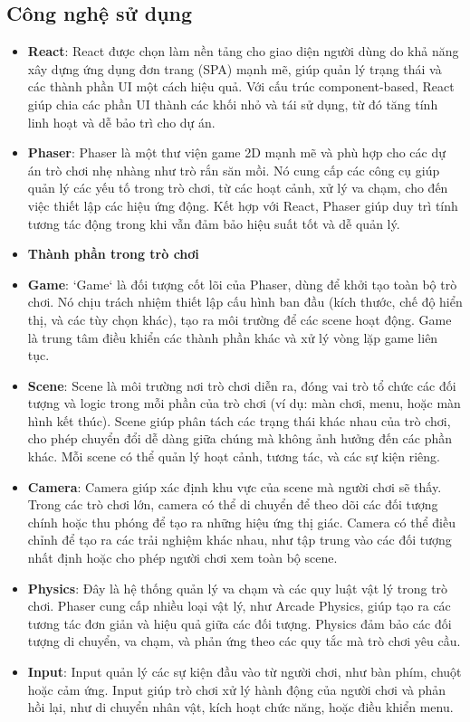 \documentclass[a4paper, 12pt]{article}
\begin{document}
\subsection{Công nghệ sử dụng}
\begin{itemize}
    \item \textbf{React}: React được chọn làm nền tảng cho giao diện người dùng do khả năng xây dựng ứng dụng đơn trang (SPA) mạnh mẽ, giúp quản lý trạng thái và các thành phần UI một cách hiệu quả. Với cấu trúc component-based, React giúp chia các phần UI thành các khối nhỏ và tái sử dụng, từ đó tăng tính linh hoạt và dễ bảo trì cho dự án.

    \item \textbf{Phaser}: Phaser là một thư viện game 2D mạnh mẽ và phù hợp cho các dự án trò chơi nhẹ nhàng như trò rắn săn mồi. Nó cung cấp các công cụ giúp quản lý các yếu tố trong trò chơi, từ các hoạt cảnh, xử lý va chạm, cho đến việc thiết lập các hiệu ứng động. Kết hợp với React, Phaser giúp duy trì tính tương tác động trong khi vẫn đảm bảo hiệu suất tốt và dễ quản lý.

    \item \textbf{Thành phần trong trò chơi}

     \item \textbf{Game}: `Game` là đối tượng cốt lõi của Phaser, dùng để khởi tạo toàn bộ trò chơi. Nó chịu trách nhiệm thiết lập cấu hình ban đầu (kích thước, chế độ hiển thị, và các tùy chọn khác), tạo ra môi trường để các scene hoạt động. Game là trung tâm điều khiển các thành phần khác và xử lý vòng lặp game liên tục.

    \item \textbf{Scene}: Scene là môi trường nơi trò chơi diễn ra, đóng vai trò tổ chức các đối tượng và logic trong mỗi phần của trò chơi (ví dụ: màn chơi, menu, hoặc màn hình kết thúc). Scene giúp phân tách các trạng thái khác nhau của trò chơi, cho phép chuyển đổi dễ dàng giữa chúng mà không ảnh hưởng đến các phần khác. Mỗi scene có thể quản lý hoạt cảnh, tương tác, và các sự kiện riêng.

    \item \textbf{Camera}: Camera giúp xác định khu vực của scene mà người chơi sẽ thấy. Trong các trò chơi lớn, camera có thể di chuyển để theo dõi các đối tượng chính hoặc thu phóng để tạo ra những hiệu ứng thị giác. Camera có thể điều chỉnh để tạo ra các trải nghiệm khác nhau, như tập trung vào các đối tượng nhất định hoặc cho phép người chơi xem toàn bộ scene.

    \item \textbf{Physics}: Đây là hệ thống quản lý va chạm và các quy luật vật lý trong trò chơi. Phaser cung cấp nhiều loại vật lý, như Arcade Physics, giúp tạo ra các tương tác đơn giản và hiệu quả giữa các đối tượng. Physics đảm bảo các đối tượng di chuyển, va chạm, và phản ứng theo các quy tắc mà trò chơi yêu cầu.

    \item \textbf{Input}: Input quản lý các sự kiện đầu vào từ người chơi, như bàn phím, chuột hoặc cảm ứng. Input giúp trò chơi xử lý hành động của người chơi và phản hồi lại, như di chuyển nhân vật, kích hoạt chức năng, hoặc điều khiển menu.
\end{itemize}
\end{document}
